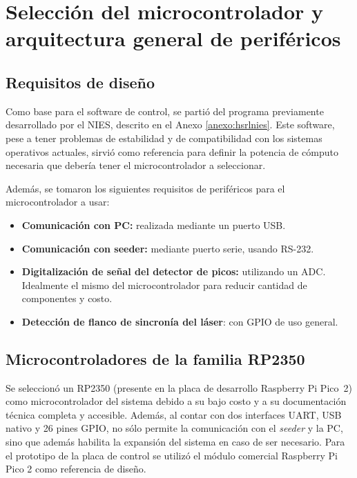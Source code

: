 
\chapter{Selección del microcontrolador y arquitectura general de periféricos}
\label{cap:micro}
\section{Requisitos de diseño}

Como base para el software de control, se partió del programa previamente desarrollado por el NIES, descrito en el Anexo \ref{anexo:hsrlnies}. Este software, pese a tener problemas de estabilidad y de compatibilidad con los sistemas operativos actuales, sirvió como referencia para definir la potencia de cómputo necesaria que debería tener el microcontrolador a seleccionar. 

Además, se tomaron los siguientes requisitos de periféricos para el microcontrolador a usar:

\begin{itemize}
    \item \textbf{Comunicación con PC:} realizada mediante un puerto USB.
    \item \textbf{Comunicación con seeder:} mediante puerto serie, usando RS-232.
    \item \textbf{Digitalización de señal del detector de picos:} utilizando un ADC. Idealmente el mismo del microcontrolador para reducir cantidad de componentes y costo.
    \item \textbf{Detección de flanco de sincronía del láser}: con GPIO de uso general.
\end{itemize}

\section{Microcontroladores de la familia RP2350}
\label{sec:rp2350}

Se seleccionó un RP2350 (presente en la placa de desarrollo Raspberry Pi Pico~2) como microcontrolador del sistema debido a su bajo costo y a su documentación técnica completa y accesible. Además, al contar con dos interfaces UART, USB nativo y 26 pines GPIO, no sólo permite la comunicación con el \emph{seeder} y la PC, sino que además habilita la expansión del sistema en caso de ser necesario. Para el prototipo de la placa de control se utilizó el módulo comercial Raspberry Pi Pico 2 como referencia de diseño.

